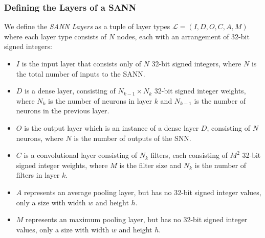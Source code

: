 \subsubsection{Defining the Layers of a \ac{SANN}}

\begin{definition}
	\label{def:layer}We define the \emph{\ac{SANN} Layers} as a tuple of layer types $\mathcal{L} = (I, D, O, C, A, M)$ where each layer type consists of $N$ nodes, each with an arrangement of 32-bit signed integers:
	\begin{itemize}
		\item $I$ is the input layer that consists only of $N$ 32-bit signed integers, where $N$ is the total number of inputs to the \ac{SANN}.
		\item $D$ is a dense layer, consisting of $N_{k-1} \times N_k$ 32-bit signed integer weights, where $N_k$ is the number of neurons in layer $k$ and $N_{k-1}$ is the number of neurons in the previous layer.
		\item $O$ is the output layer which is an instance of a dense layer $D$, consisting of $N$ neurons, where $N$ is the number of outputs of the \ac{SNN}.
		\item $C$ is a convolutional layer consisting of $N_k$ filters, each consisting of $M^2$ 32-bit signed integer weights, where $M$ is the filter size and $N_k$ is the number of filters in layer $k$.
		\item $A$ represents an average pooling layer, but has no 32-bit signed integer values, only a size with width $w$ and height $h$.
		\item $M$ represents an maximum pooling layer, but has no 32-bit signed integer values, only a size with width $w$ and height $h$.
	\end{itemize}
\end{definition}

